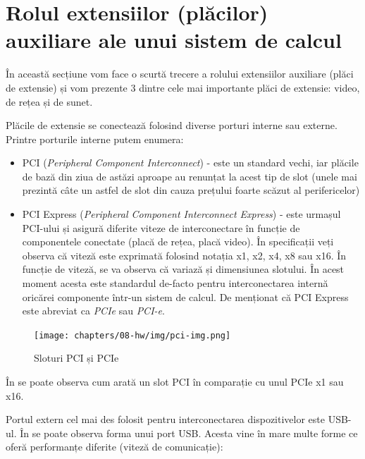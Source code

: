 \section{Rolul extensiilor (plăcilor) auxiliare ale unui sistem de calcul}
\label{sec:hardware-extensii}

În această secțiune vom face o scurtă trecere a rolului extensiilor auxiliare
(plăci de extensie) și vom prezente 3 dintre cele mai importante plăci de
extensie: video, de rețea și de sunet.

Plăcile de extensie se conectează folosind diverse porturi interne sau externe.
Printre porturile interne putem enumera:

\begin{itemize}
	\item PCI 
		(\textit{Peripheral Component Interconnect}) - este un standard
		vechi, iar plăcile de bază din ziua de astăzi aproape au
		renunțat la acest tip de slot (unele mai prezintă câte un astfel
		de slot din cauza prețului foarte scăzut al perifericelor)
	\item PCI Express (\textit{Peripheral Component Interconnect Express}) -
		este urmașul PCI-ului și asigură diferite viteze de
		interconectare în funcție de componentele conectate (placă de
		rețea, placă video). În specificații veți observa că viteză
		este exprimată folosind notația x1, x2, x4, x8 sau x16. În
		funcție de viteză, se va observa că variază și dimensiunea
		slotului. În acest moment acesta este standardul de-facto pentru
		interconectarea internă oricărei componente într-un sistem de
		calcul. De menționat că PCI Express este abreviat ca
		\textit{PCIe} sau \textit{PCI-e}.
\end{itemize}

\begin{figure}[!htbp]
	\centering
	\texttt{[image: chapters/08-hw/img/pci-img.png]}
	\caption{Sloturi PCI și PCIe\protect\footnotemark}
	\label{fig:hw-pci}
\end{figure}


În  se poate observa cum arată un slot PCI în
comparație cu unul PCIe x1 sau x16.

Portul extern cel mai des folosit pentru interconectarea dispozitivelor este
USB-ul. În  se poate observa forma unui port USB. Acesta vine în mare
multe forme ce oferă performanțe diferite (viteză de comunicație):

